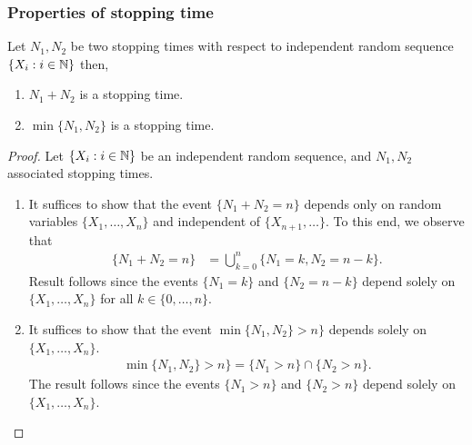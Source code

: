\documentclass[a4paper,10pt, english]{article}
\begin{document}
\subsubsection{Properties of stopping time}
Let $N_1,N_2$ be two stopping times with respect to independent random sequence $\{X_i : i \in \mathbb{N} \}$ then,
\begin{enumerate}[i\_]
\item $N_1+N_2$ is a stopping time.
\item $\min \{N_1,N_2\} $ is a stopping time.
\end{enumerate}
\begin{proof}
Let $\{X_i : i \in \mathbb{N} \} $ be an independent random sequence, and $N_1,N_2$ associated stopping times.  
\begin{enumerate}[i\_]
\item It suffices to show that the event $\{N_1+N_2=n\}$ depends only on random variables $\{X_1, \dots, X_n\}$ and independent of $\{X_{n+1}, \dots\}$. 
To this end, we observe that 
\begin{align*}
\{N_1+N_2 = n \} &= \bigcup_{k=0}^{n} \{N_1 = k,N_2 = n-k\}.
\end{align*}
Result follows since the events $\{N_1 = k\}$ and $\{N_2=n-k\}$ depend solely on $\{X_1, \dots, X_n\}$ for all $k \in \{0, \dots, n\}$. 
\item It suffices to show that the event $\min \{N_1,N_2\} > n\}$ depends solely on $\{X_1, \dots, X_n\}$. 
\begin{align*}
\min \{N_1,N_2\} > n\} = \{N_1 > n\} \cap \{N_2 > n\}.
\end{align*}
The result follows since the events $\{N_1 > n\}$ and $\{N_2 > n\}$ depend solely on $\{X_1, \dots, X_n\}$. 
\end{enumerate}
\end{proof}
\end{document}
